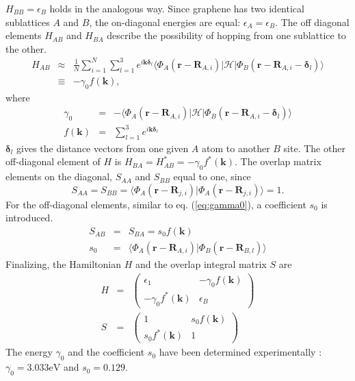 $H_{B B} = \epsilon_B$ holds in the analogous way. Since graphene has two identical sublattices $A$ and $B$, the on-diagonal energies are equal: $\epsilon_A = \epsilon_B$. 
The off diagonal elements $H_{A B}$ and $H_{B A}$ describe the possibility of hopping from one sublattice to the other. 
\begin{eqnarray}
H_{A B } &\approx & \frac{1}{N} \sum_{i = 1}^N \sum_{l = 1}^3 e^{i \mathbf{k} \bm{\delta}_l} \langle \Phi_A ( \mathbf{r} - \mathbf{R}_{A, i} ) | \mathcal{H} | \Phi_B ( \mathbf{r} - \mathbf{R}_{A, i} - \bm{\delta}_l ) \rangle  \\
& \equiv & - \gamma_0 f \left( \mathbf{k} \right) \label{eq:gamma0},
\end{eqnarray}
where
\begin{eqnarray}
\gamma_0 &=& - \langle \Phi_A ( \mathbf{r} - \mathbf{R}_{A, i} )| \mathcal{H} | \Phi_B ( \mathbf{r} - \mathbf{R}_{A, i} - \bm{\delta}_l ) \rangle \\
f \left( \mathbf{k} \right) &=&  \sum_{l = 1}^3 e^{i \mathbf{k} \bm{\delta}_l} 
\end{eqnarray}
$\bm{\delta}_l$ gives the distance vectors from one given $A$ atom to another $B$ site. The other off-diagonal element of $H$ is $H_{B A} = H_{A B}^* = - \gamma_0 f^* \left( \mathbf{k} \right)$. The overlap matrix elements on the diagonal, $S_{A A}$ and $S_{B B}$ equal to one, since 
\begin{equation}
S_{A A} = S_{B B} = \langle \Phi_A ( \mathbf{r} - \mathbf{R}_{j, i} ) | \Phi_A ( \mathbf{r} - \mathbf{R}_{j, i} ) \rangle = 1.
\end{equation}
For the off-diagonal elements, similar to eq. (\ref{eq:gamma0}), a coefficient $s_0$ is introduced.
\begin{eqnarray}
S_{A B} &=& S_{B A} = s_0 f \left( \mathbf{k} \right) \\
s_0 &=& \langle \Phi_A ( \mathbf{r} - \mathbf{R}_{A, i} ) | \Phi_B ( \mathbf{r} - \mathbf{R}_{B, l} ) \rangle 
\end{eqnarray}
Finalizing, the Hamiltonian $H$ and the overlap integral matrix $S$ are
\begin{eqnarray}
H &=& \begin{pmatrix} \epsilon_1 & - \gamma_0 f \left( \mathbf{k} \right) \\ - \gamma_0 f^* \left( \mathbf{k} \right) & \epsilon_B \end{pmatrix} \\
S &=& \begin{pmatrix} 1 & s_0 f \left( \mathbf{k} \right) \\ s_0 f^* \left( \mathbf{k} \right) & 1 \end{pmatrix}
\end{eqnarray}
The energy $\gamma_0$ and the coefficient $s_0$ have been determined experimentally \cite{Dresselhaus1995}:
$\gamma_0 = 3.033 \text{eV}$ and $s_0 = 0.129$.

